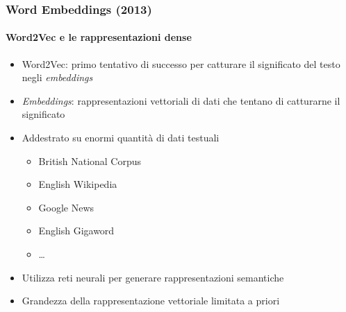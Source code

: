 \begin{frame}[t,fragile] \frametitle{Word Embeddings (2013)}
	\framesubtitle{Word2Vec e le rappresentazioni dense}
	    \begin{minipage}[t]{\textwidth}
	    	\begin{itemize}[leftmargin=10pt,align=right]
				\onslide<1->\item[\alert{\faArrowCircleRight}] \alert{Word2Vec:} primo tentativo di successo per catturare il significato del testo negli \textit{embeddings}
				\onslide<2->\item[\alert{\faArrowCircleRight}] \alert{\textit{Embeddings}:} rappresentazioni vettoriali di dati che tentano di catturarne il significato
				\onslide<3->\item[\alert{\faArrowCircleRight}] Addestrato su \alert{enormi quantità} di dati testuali
				\begin{itemize}[leftmargin=10pt,align=right]
					\item[\alert{\faArrowCircleRight}] British National Corpus
					\item[\alert{\faArrowCircleRight}] English Wikipedia
					\item[\alert{\faArrowCircleRight}] Google News
					\item[\alert{\faArrowCircleRight}] English Gigaword
					\item[\alert{\faArrowCircleRight}] \ldots
				\end{itemize}
				\item[\alert{\faArrowCircleRight}] Utilizza \alert{reti neurali} per generare rappresentazioni semantiche
				\onslide<5->\item[\alert{\faExclamationTriangle}] Grandezza della rappresentazione vettoriale \alert{limitata a priori}
			\end{itemize}
	    \end{minipage}
\end{frame}
%

